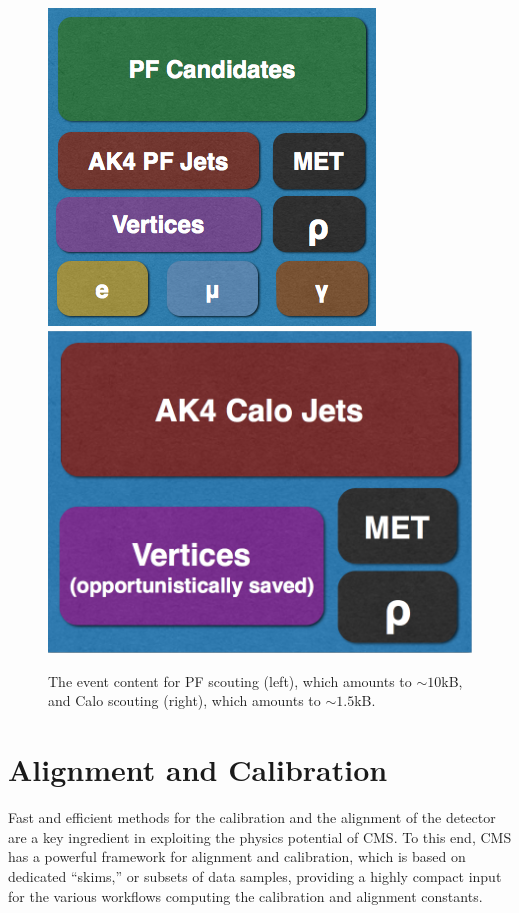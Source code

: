 \begin{figure}\centering
\includegraphics[width=.45\textwidth]{figs/cms/pfscoutingeventcontent.png}
\includegraphics[width=.45\textwidth]{figs/cms/caloscoutingeventcontent.png}
\caption{The event content for PF scouting (left), which amounts to
  $\sim 10$\unit{kB}, and Calo scouting (right), which amounts to
  $\sim 1.5$\unit{kB}.\label{fig:DataScoutingContent}}
\end{figure}

\section{Alignment and Calibration}
\label{sec:alca}

Fast and efficient methods for the calibration and the alignment of
the detector are a key ingredient in exploiting the physics potential of
CMS. To this end, CMS has a powerful framework for alignment and
calibration, which is based on dedicated ``skims,'' or subsets of data samples, providing a highly
compact input for the various workflows computing the
calibration and alignment constants. 

